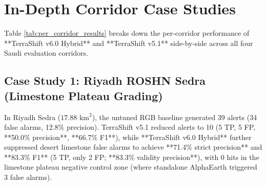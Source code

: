 \section{In-Depth Corridor Case Studies}
\label{sec:res_case_studies}
Table \ref{tab:per_corridor_results} breaks down the per-corridor performance of **TerraShift v6.0 Hybrid** and **TerraShift v5.1** side-by-side across all four Saudi evaluation corridors.

\begin{table}[htbp]
\centering
\caption{Per-Corridor Performance Breakdown: TerraShift v6.0 Hybrid vs. TerraShift v5.1 ($91.19\text{ km}^2$).}
\label{tab:per_corridor_results}
\end{table}

\subsection{Case Study 1: Riyadh ROSHN Sedra (Limestone Plateau Grading)}
In Riyadh Sedra ($17.88\text{ km}^2$), the untuned RGB baseline generated 39 alerts (34 false alarms, 12.8\% precision). TerraShift v5.1 reduced alerts to 10 (5 TP, 5 FP, **50.0\% precision**, **66.7\% F1**), while **TerraShift v6.0 Hybrid** further suppressed desert limestone false alarms to achieve **71.4\% strict precision** and **83.3\% F1** (5 TP, only 2 FP; **83.3\% validity precision**), with 0 hits in the limestone plateau negative control zone (where standalone AlphaEarth triggered 3 false alarms).

